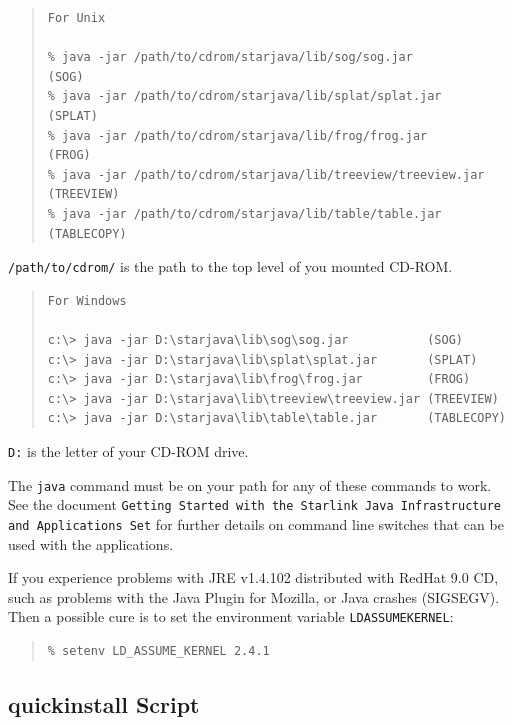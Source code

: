 \documentclass[twoside,11pt]{article}
\newcommand{\xref}[3]{#1}
\newcommand{\xlabel}[1]{}
\renewcommand{\_}{\texttt{\symbol{95}}}
\begin{document}
\begin{quote}
\begin{verbatim}
For Unix

% java -jar /path/to/cdrom/starjava/lib/sog/sog.jar           (SOG)
% java -jar /path/to/cdrom/starjava/lib/splat/splat.jar       (SPLAT)
% java -jar /path/to/cdrom/starjava/lib/frog/frog.jar         (FROG)
% java -jar /path/to/cdrom/starjava/lib/treeview/treeview.jar (TREEVIEW)
% java -jar /path/to/cdrom/starjava/lib/table/table.jar       (TABLECOPY)
\end{verbatim}
\end{quote}

\texttt{/path/to/cdrom/} is the path to the top level of you mounted CD-ROM.

\begin{quote}
\begin{verbatim}
For Windows

c:\> java -jar D:\starjava\lib\sog\sog.jar           (SOG)
c:\> java -jar D:\starjava\lib\splat\splat.jar       (SPLAT)
c:\> java -jar D:\starjava\lib\frog\frog.jar         (FROG)
c:\> java -jar D:\starjava\lib\treeview\treeview.jar (TREEVIEW)
c:\> java -jar D:\starjava\lib\table\table.jar       (TABLECOPY)
\end{verbatim}
\end{quote}
\texttt{D:} is the letter of your CD-ROM drive.

The \texttt{java} command must be on your path for any of these commands to work.
See the document \xref{}{sun251}{} \texttt{Getting Started with the Starlink 
Java Infrastructure and Applications Set} for further details on command
line switches that can be used with the applications.

If you experience problems with JRE v1.4.1\_02 distributed with
RedHat 9.0 CD, such as problems with the Java Plugin for Mozilla,
or Java crashes (SIGSEGV). Then a possible cure is to set the 
environment variable \texttt{LD\_ASSUME\_KERNEL}:

\begin{quote}
\begin{verbatim}
% setenv LD_ASSUME_KERNEL 2.4.1
\end{verbatim}
\end{quote}

\subsection{\xlabel{quickin}quick\_install Script}
\end{document}

